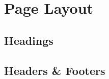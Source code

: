 \setchapterpreamble[u]{\margintoc[*-6]}
\chapter{Page Layout}

\section{Headings}

\blindtext

\section{Headers \& Footers}

\blindtext

